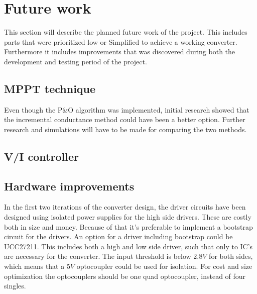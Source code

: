 \section{Future work}
This section will describe the planned future work of the project. This includes parts that were prioritized low or Simplified to achieve a working converter. Furthermore it includes improvements that was discovered during both the development and testing period of the project.


\subsection{MPPT technique}
Even though the P\&O algorithm was implemented, initial research showed that the incremental conductance method could have been a better option.  Further research and simulations will have to be made for comparing the two methods. 

\subsection{V/I controller}

\subsection{Hardware improvements}
In the first two iterations of the converter design, the driver circuits have been designed using isolated power supplies for the high side drivers. These are costly both in size and money. Because of that it's preferable to implement a bootstrap circuit for the drivers. An option for a driver including bootstrap could be UCC27211\cite{boot_driver_datasheet}. This includes both a high and low side driver, such that only to IC's are necessary for the converter. The input threshold is below $2.8V$ for both sides, which means that a $5V$ optocoupler could be used for isolation. For cost and size optimization the optocouplers should be one quad optocoupler, instead of four singles. 
 

